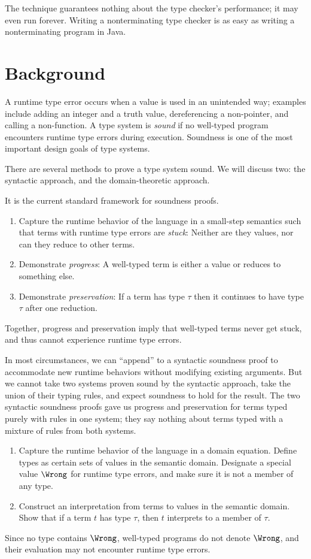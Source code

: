 \documentclass{amsart}
\begin{document}
The technique guarantees nothing about the type checker's
performance; it may even run forever. Writing a nonterminating
type checker is as easy as writing a nonterminating program in
Java.

\section{Background}

A runtime type error occurs when a value is used in an unintended
way; examples include adding an integer and a truth value,
dereferencing a non-pointer, and calling a non-function. A type
system is \emph{sound} if no well-typed program encounters
runtime type errors during execution. Soundness is one of the
most important design goals of type systems.

There are several methods to prove a type system sound. We will
discuss two: the syntactic approach, and the domain-theoretic
approach.


It is the current standard framework for soundness proofs.
\begin{enumerate}
\item Capture the runtime behavior of the language in a
small-step semantics such that terms with runtime type errors are
\emph{stuck}: Neither are they values, nor can they reduce to
other terms.
\item Demonstrate \emph{progress}: A well-typed term is either a
value or reduces to something else.
\item Demonstrate \emph{preservation}: If a term has type $\tau$
then it continues to have type $\tau$ after one reduction.
\end{enumerate}
Together, progress and preservation imply that well-typed terms
never get stuck, and thus cannot experience runtime type errors.

In most circumstances, we can ``append'' to a syntactic soundness
proof to accommodate new runtime behaviors without modifying
existing arguments. But we cannot take two systems proven sound
by the syntactic approach, take the union of their typing rules,
and expect soundness to hold for the result. The two syntactic
soundness proofs gave us progress and preservation for terms
typed purely with rules in one system; they say nothing about
terms typed with a mixture of rules from both systems.


\begin{enumerate}
\item Capture the runtime behavior of the language in a domain
equation. Define types as certain sets of values in the semantic
domain. Designate a special value $\Wrong$ for runtime type
errors, and make sure it is not a member of any type.
\item Construct an interpretation from terms to values in the
semantic domain. Show that if a term $t$ has type $\tau$, then
$t$ interprets to a member of $\tau$.
\end{enumerate}
Since no type contains $\Wrong$, well-typed programs do not
denote $\Wrong$, and their evaluation may not encounter runtime
type errors.
\end{document}
